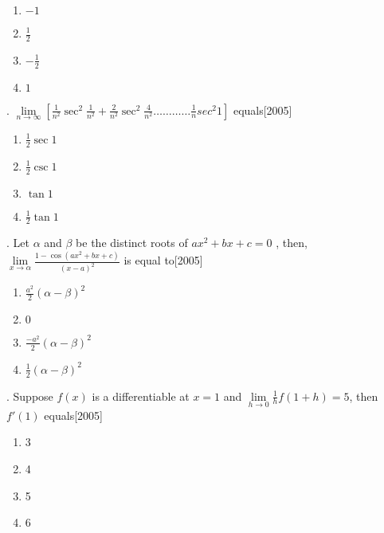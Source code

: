 \documentclass[journal,12pt,twocolumn]{IEEEtran}
\theoremstyle{remark}
\begin{document}
\begin{enumerate}
    \item $-1$
    \item $\frac{1}{2}$
    \item $-\frac{1}{2}$
    \item $1$\\[2pt]
\end{enumerate}

. $\displaystyle\lim\limits_{n\to\infty}\left[\frac{1}{n^2}\sec^2\frac{1}{n^2}+\frac{2}{n^2}\sec^2\frac{4}{n^2}\dots\dots\dots\dots\frac{1}{n}sec^2 1\right]$ equals\hfill[2005]

\begin{enumerate}
    \item $\frac{1}{2}\sec 1$
    \item $\frac{1}{2}\csc 1$
    \item $\tan 1$
    \item $\frac{1}{2} \tan 1$\\[2pt]
\end{enumerate}

. Let $\alpha$ and $\beta$ be the distinct roots of $ax^2+bx+c=0$ , then, $\displaystyle\lim\limits_{x\to\alpha}\frac{1-\cos(ax^2+bx+c)}{(x-a)^2}$ is equal to\hfill[2005]

\begin{enumerate}
    \item $\frac{a^2}{2}(\alpha-\beta)^2$
    \item $0$
    \item $\frac{-a^2}{2}(\alpha-\beta)^2$
    \item $\frac{1}{2}(\alpha-\beta)^2$\\[2pt]
\end{enumerate}

. Suppose $f(x)$ is a differentiable at $x=1$ and $\lim\limits_{h\to 0}\frac{1}{h}f(1+h)=5$, then $f'(1)$ equals\hfill[2005]

\begin{enumerate}
    \item 3
    \item 4
    \item 5
    \item 6
\end{enumerate}
 
\end{document}
